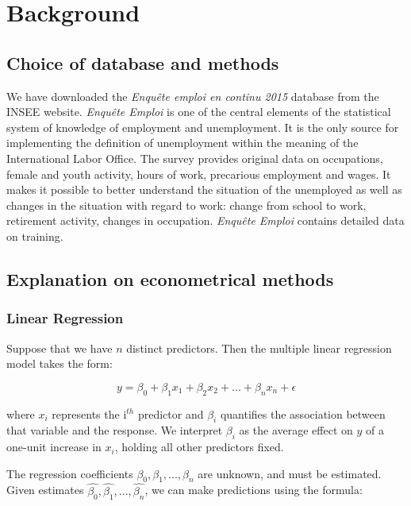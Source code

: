 \section{Background}

\subsection{Choice of database and methods}
We have downloaded the \textit{Enqu\^ete emploi en continu 2015} database from the INSEE website.
\textit{Enqu\^ete Emploi} is one of the central elements of the statistical system of knowledge of
employment and unemployment. It is the only source for implementing the definition of unemployment
within the meaning of the International Labor Office. The survey provides original data on
occupations, female and youth activity, hours of work, precarious employment and wages. It makes it
possible to better understand the situation of the unemployed as well as changes in the situation
with regard to work: change from school to work, retirement activity, changes in occupation.
\textit{Enqu\^ete Emploi} contains detailed data on training.


\subsection{Explanation on econometrical methods}
\subsubsection{Linear Regression}

Suppose that we have $n$ distinct predictors. Then the multiple linear regression model takes the
form:

\begin{equation}
    y = \beta_0 + \beta_1 x_1 + \beta_2 x_2 + ... + \beta_n x_n + \epsilon
\end{equation}

where $x_i$ represents the i$^{th}$ predictor and $\beta_i$ quantifies the association between that
variable and the response. We interpret $\beta_i$ as the average effect on $y$ of a one-unit
increase in $x_i$, holding all other predictors fixed.

The regression coefficients $\beta_0, \beta_1, ..., \beta_n$ are unknown, and must be estimated.
Given estimates $\hat{\beta_0}, \hat{\beta_1}, ..., \hat{\beta_n}$, we can make predictions using
the formula:

